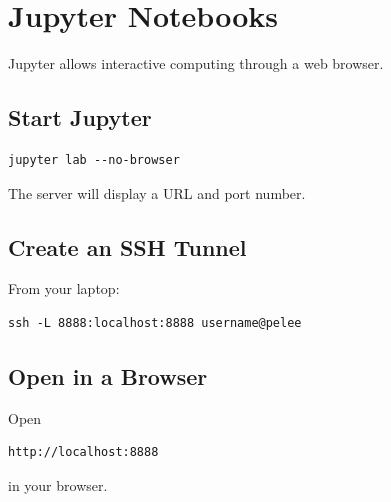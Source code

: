 \section{Jupyter Notebooks} 

Jupyter allows interactive computing through a web browser. 

\subsection{Start Jupyter} 

\begin{lstlisting} 
jupyter lab --no-browser 
\end{lstlisting} 

The server will display a URL and port number. 

\subsection{Create an SSH Tunnel} 

From your laptop: 

\begin{lstlisting} 
ssh -L 8888:localhost:8888 username@pelee 
\end{lstlisting} 

\subsection{Open in a Browser} 

Open 

\begin{lstlisting} 
http://localhost:8888 
\end{lstlisting} 

in your browser.